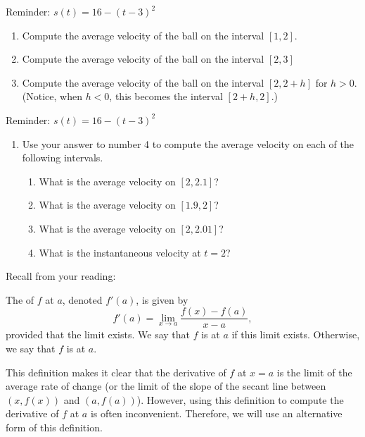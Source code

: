\documentclass[handout,nooutcomes,noauthor,12pt]{ximera}
\begin{document}
	Reminder: $ s(t)=16-(t-3)^2 $
	
	\begin{enumerate}[resume,label=\arabic*.]
		\item Compute the average velocity of the ball on the interval $ [1, 2] $.
		\vspace{3cm}
		\item Compute the average velocity of the ball on the interval $ [2, 3] $
		\vspace{3cm}
		\item Compute the average velocity of the ball on the interval $ [2, 2+h] $ for $ h>0 $.  (Notice, when $ h<0 $, this becomes the interval $ [2+h, 2] $.)
		
		\clearpage
		
	\end{enumerate}
	
	Reminder: $ s(t)=16-(t-3)^2 $
	
	\begin{enumerate}[resume,label=\arabic*.]
		\item Use your answer to number 4 to compute the average velocity on each of the following intervals.
		\begin{enumerate}[label=(\alph*)]
			\item What is the average velocity on $ [2, 2.1] $?
			\vspace{3cm}
			\item What is the average velocity on $ [1.9, 2] $?
			\vspace{3cm}
			\item What is the average velocity on $ [2, 2.01] $?
			\vspace{3cm}
			\item What is the instantaneous velocity at $ t=2 $?
		\end{enumerate}
	\end{enumerate}

	\clearpage
	Recall from your reading:
	
	 \begin{definition}
		The  of $f$ at $a$, denoted $f'(a)$, is given by
		\[
		f'(a) = \lim_{x\to a} \frac{f(x) - f(a)}{x-a},
		\]
		provided that the limit exists. We say that $f$ is 
		at $a$ if  this limit exists. Otherwise,  we say that  $f$ is  at $a$.
	\end{definition}
	\vspace{1cm}
	
	This definition makes it clear that the derivative of $f$ at $x=a$ is the limit of the average rate of change (or the limit of the slope of the secant line between $(x, f(x))$ and $(a, f(a))$).  However, using this definition to compute the derivative of $f$ at $a$ is often inconvenient.  Therefore, we will use an alternative form of this definition.
	
\end{document}

